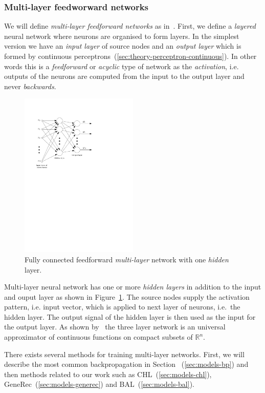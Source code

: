 \subsubsection{Multi-layer feedworward networks} 
\label{sec:theory-multilayer} 

We will define \emph{multi-layer feedforward networks} as in~\citet{haykin1994neural}. First, we define a \emph{layered} neural network where neurons are organised to form layers. In the simplest version we have an \emph{input layer} of source nodes and an \emph{output layer} which is formed by continuous perceptrons~(\ref{sec:theory-perceptron-continuous}). In other words this is a \emph{feedforward} or \emph{acyclic} type of network as the \emph{activation}, i.e. outputs of the neurons are computed from the input to the output layer and never \emph{backwards}. 

\begin{figure}[h]
  \centering
  \includegraphics[width=0.5\textwidth]{img/multilayer.pdf}    
  \caption{Fully connected feedforward \emph{multi-layer} network with one \emph{hidden} layer. } 
  \label{fig:multilayer}
\end{figure}

Multi-layer neural network has one or more \emph{hidden layers} in addition to the input and ouput layer as shown in Figure~\ref{fig:multilayer}. The source nodes supply the activation pattern, i.e. input vector, which is applied to next layer of neurons, i.e.~the hidden layer. The output signal of the hidden layer is then used as the input for the output layer. As shown by~\citet{cybenko1989approximation} the three layer network is an universal approximator of continuous functions on compact subsets of $\mathbb{R}^n$.

There exists several methods for training multi-layer networks. First, we will describe the most common backpropagation in Section ~(\ref{sec:models-bp}) and then methods related to our work such as CHL~(\ref{sec:models-chl}), GeneRec~(\ref{sec:models-generec}) and BAL~(\ref{sec:models-bal}). 
